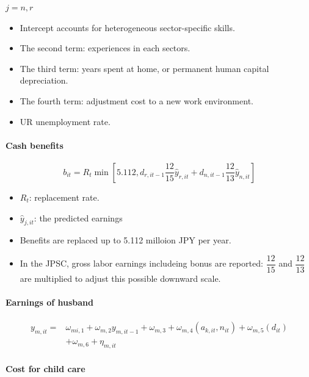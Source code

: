 \documentclass[../root]{subfiles}
\begin{document}
    $j = n, r$

    \begin{itemize}
      \item Intercept accounts for heterogeneous sector-specific skills.
      \item The second term: experiences in each sectors.
      \item The third term:  years spent at home, or permanent human capital depreciation.
      \item The fourth term: adjustment cost to a new work environment.
      \item $\text{UR}$ unemployment rate.
    \end{itemize}

    \paragraph{Cash benefits}

    \[
    b_{it} = R_t \min \left[ 5.112, d_{r, it - 1} \dfrac{12}{15}\hat{y}_{r, it} + d_{n, it-1} \dfrac{12}{13} \hat{y}_{n, it} \right]
    \]

    \begin{itemize}
      \item $R_t$: replacement rate.
      \item $\hat{y}_{j, it}$: the predicted earnings
      \item Benefits are replaced up to 5.112 milloion JPY per year.
      \item In the JPSC, gross labor earnings includeing bonus are reported: $\dfrac{12}{15}$ and $\dfrac{12}{13}$ are multiplied to adjust this possible downward scale.
    \end{itemize}

    \paragraph{Earnings of husband}

    \begin{align*}
      y_{m, it} = &\omega_{mi, 1} + \omega_{m, 2} y_{m, it-1} + \omega_{m, 3} + \omega_{m, 4} (a_{k, it}, n_{it}) + \omega_{m, 5} (d_{it}) \\
      & + \omega_{m, 6} + \eta_{m, it}
    \end{align*}

    \paragraph{Cost for child care}
\end{document}
